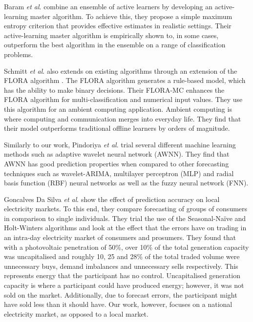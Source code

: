 Baram \textit{et al}. \cite{Baram2003} combine an ensemble of active learners by developing an active-learning master algorithm. To achieve this, they propose a simple maximum entropy criterion that provides effective estimates in realistic settings. Their active-learning master algorithm is empirically shown to, in some cases, outperform the best algorithm in the ensemble on a range of classification problems.

Schmitt \textit{et al}.\cite{Schmitt2008} also extends on existing algorithms through an extension of the FLORA algorithm \cite{Widmer1996}. The FLORA algorithm generates a rule-based model, which has the ability to make binary decisions. Their FLORA-MC enhances the FLORA algorithm for multi-classification and numerical input values. They use this algorithm for an ambient computing application. Ambient computing is where computing and communication merges into everyday life. They find that their model outperforms traditional offline learners by orders of magnitude.

Similarly to our work, Pindoriya \textit{et al}. \cite{Pindoriya2008} trial several different machine learning methods such as adaptive wavelet neural network (AWNN). They find that AWNN has good prediction properties when compared to other forecasting techniques such as wavelet-ARIMA, multilayer perceptron (MLP) and radial basis function (RBF) neural networks as well as the fuzzy neural network (FNN).


Goncalves Da Silva \textit{et al}. \cite{GoncalvesDaSilva2014} show the effect of prediction accuracy on local electricity markets. To this end, they compare forecasting of groups of consumers in comparison to single individuals. They trial the use of the Seasonal-Naïve and Holt-Winters algorithms and look at the effect that the errors have on trading in an intra-day electricity market of consumers and prosumers. They found that with a photovoltaic penetration of 50\%, over 10\% of the total generation capacity was uncapitalised and roughly 10, 25 and 28\% of the total traded volume were unnecessary buys, demand imbalances and unnecessary sells respectively. This represents energy that the participant has no control. Uncapitalised generation capacity is where a participant could have produced energy; however, it was not sold on the market. Additionally, due to forecast errors, the participant might have sold less than it should have. Our work, however, focuses on a national electricity market, as opposed to a local market.




